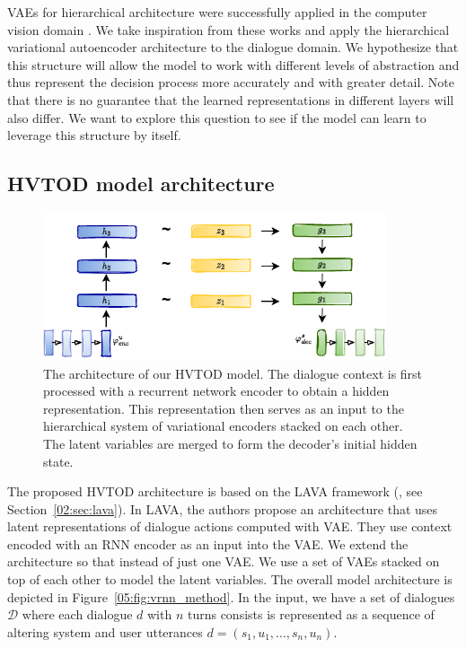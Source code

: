 VAEs for hierarchical architecture were successfully applied in the computer vision domain \cite{vahdat2020nvae,li2020progressive}.
We take inspiration from these works and apply the hierarchical variational autoencoder architecture to the dialogue domain.
We hypothesize that this structure will allow the model to work with different levels of abstraction and thus represent the decision process more accurately and with greater detail.
Note that there is no guarantee that the learned representations in different layers will also differ.
We want to explore this question to see if the model can learn to leverage this structure by itself. 

\subsection{HVTOD model architecture}
\begin{figure}[h]
    \centering
    \includegraphics[width=0.9\textwidth]{images/HVTOD-full-noN.pdf}
    \caption{The architecture of our HVTOD model. The dialogue context is first processed with a recurrent network encoder to obtain a hidden representation. This representation then serves as an input to the hierarchical system of variational encoders stacked on each other. The latent variables are merged to form the decoder's initial hidden state.}
    \label{05:fig:HVTOD-full}
\end{figure}
The proposed HVTOD architecture is based on the LAVA framework (\cite{lubis-etal-2022-dialogue}, see Section~\ref{02:sec:lava}).
In LAVA, the authors propose an architecture that uses latent representations of dialogue actions computed with VAE.
They use context encoded with an RNN encoder as an input into the VAE.
We extend the architecture so that instead of just one VAE.
We use a set of VAEs stacked on top of each other to model the latent variables.
The overall model architecture is depicted in Figure~\ref{05:fig:vrnn_method}.
In the input, we have a set of dialogues $\mathcal{D}$ where each dialogue $d$ with $n$ turns consists is represented as a sequence of altering system and user utterances $d = (s_1,u_1,...,s_n,u_n)$.
